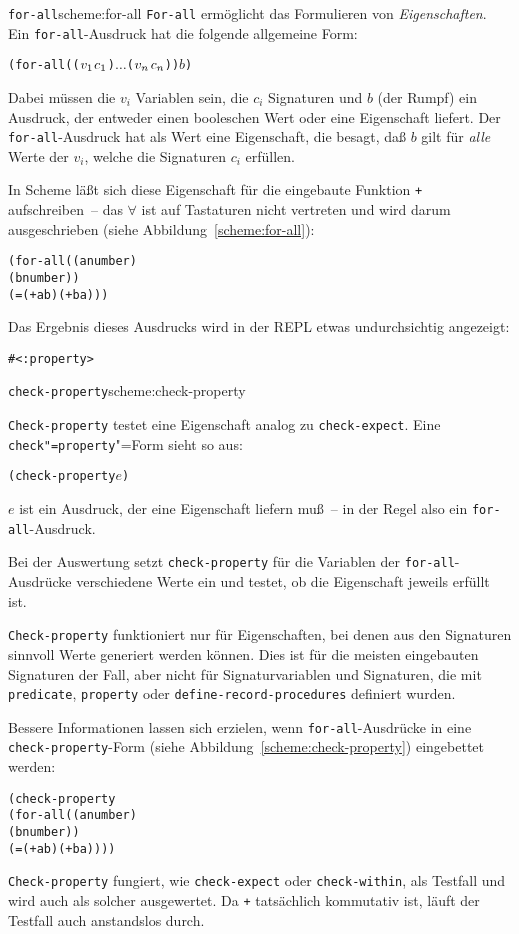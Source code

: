 \begin{feature}{\texttt{for-all}}{scheme:for-all}
  \texttt{For-all} ermöglicht das
  Formulieren von \textit{Eigenschaften}.  Ein
  \texttt{for-all}-Ausdruck hat die folgende allgemeine Form:
%
\begin{alltt}
(for-all ((\(v\sb{1}\) \(c\sb{1}\)) \(\ldots\) (\(v\sb{n}\) \(c\sb{n}\))) \(b\))
\end{alltt}
%
Dabei müssen die $v_i$ Variablen sein, die $c_i$ Signaturen und $b$ (der
Rumpf) ein Ausdruck, der entweder einen booleschen Wert oder eine
Eigenschaft liefert.  Der \texttt{for-all}-Ausdruck hat als Wert eine
Eigenschaft, die besagt, daß \(b\) gilt für \emph{alle} Werte der
$v_i$, welche die Signaturen $c_i$ erfüllen.
\end{feature}

In Scheme läßt sich diese Eigenschaft für die eingebaute Funktion
\texttt{+} aufschreiben~-- das $\forall$ ist auf
Tastaturen nicht vertreten und wird darum ausgeschrieben (siehe
Abbildung~\ref{scheme:for-all}):
%
\begin{alltt}
(for-all ((a number)
          (b number))
  (= (+ a b) (+ b a)))
\end{alltt}
%
Das Ergebnis dieses Ausdrucks wird in der REPL etwas undurchsichtig
angezeigt:
%
\begin{alltt}
\evalsto{} #<:property>
\end{alltt}
%
\begin{feature}{\texttt{check-property}}{scheme:check-property}

\texttt{Check-property}
testet eine Eigenschaft analog zu \texttt{check-expect}.  Eine
\texttt{check"=property}"=Form sieht so aus:
%
\begin{alltt}
(check-property \(e\)) 
\end{alltt}
%
$e$ ist ein Ausdruck, der eine Eigenschaft liefern muß~-- in der Regel
also ein \texttt{for-all}-Ausdruck.

Bei der Auswertung setzt \texttt{check-property} für die Variablen der
\texttt{for-all}-Ausdrücke verschiedene Werte ein und testet, ob die
Eigenschaft jeweils erfüllt ist.

\texttt{Check-property} funktioniert nur für Eigenschaften, bei denen
aus den Signaturen sinnvoll Werte generiert werden können.  Dies ist
für die meisten eingebauten Signaturen der Fall, aber nicht für
Signaturvariablen und Signaturen, die mit \texttt{predicate},
\texttt{property} oder \texttt{define-record-procedures} definiert
wurden.
\end{feature}
%
Bessere Informationen lassen sich erzielen, wenn \texttt{for-all}-Ausdrücke in
eine  \texttt{check-property}-Form
(siehe Abbildung~\ref{scheme:check-property}) eingebettet werden:
%
\begin{alltt}
(check-property
  (for-all ((a number)
            (b number))
    (= (+ a b) (+ b a))))
\end{alltt}
%
\texttt{Check-property} fungiert, wie \texttt{check-expect} oder
\texttt{check-within}, als Testfall und wird auch als solcher
ausgewertet.  Da \texttt{+} tatsächlich kommutativ ist, läuft der
Testfall auch anstandslos durch.

